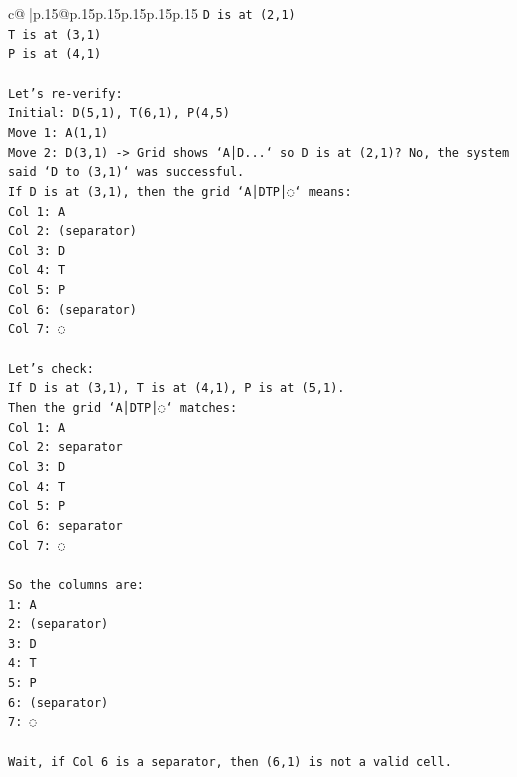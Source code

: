\documentclass{article}
\begin{document}
{\begin{supertabular}{c@{$\;$}|p{.15\linewidth}@{}p{.15\linewidth}p{.15\linewidth}p{.15\linewidth}p{.15\linewidth}p{.15\linewidth}}
{{{\texttt{D is at (2,1)} \\
\texttt{T is at (3,1)} \\
\texttt{P is at (4,1)} \\
\\ 
\texttt{Let's re{-}verify:} \\
\texttt{Initial: D(5,1), T(6,1), P(4,5)} \\
\texttt{Move 1: A(1,1)} \\
\texttt{Move 2: D(3,1) {-}> Grid shows `A│D...` so D is at (2,1)? No, the system said `D to (3,1)` was successful.} \\
\texttt{If D is at (3,1), then the grid `A│DTP│◌` means:} \\
\texttt{Col 1: A} \\
\texttt{Col 2: (separator)} \\
\texttt{Col 3: D} \\
\texttt{Col 4: T} \\
\texttt{Col 5: P} \\
\texttt{Col 6: (separator)} \\
\texttt{Col 7: ◌} \\
\\ 
\texttt{Let's check:} \\
\texttt{If D is at (3,1), T is at (4,1), P is at (5,1).} \\
\texttt{Then the grid `A│DTP│◌` matches:} \\
\texttt{Col 1: A} \\
\texttt{Col 2: separator} \\
\texttt{Col 3: D} \\
\texttt{Col 4: T} \\
\texttt{Col 5: P} \\
\texttt{Col 6: separator} \\
\texttt{Col 7: ◌} \\
\\ 
\texttt{So the columns are:} \\
\texttt{1: A} \\
\texttt{2: (separator)} \\
\texttt{3: D} \\
\texttt{4: T} \\
\texttt{5: P} \\
\texttt{6: (separator)} \\
\texttt{7: ◌} \\
\\ 
\texttt{Wait, if Col 6 is a separator, then (6,1) is not a valid cell.} \\
}}}
\end{supertabular}}
\end{document}
